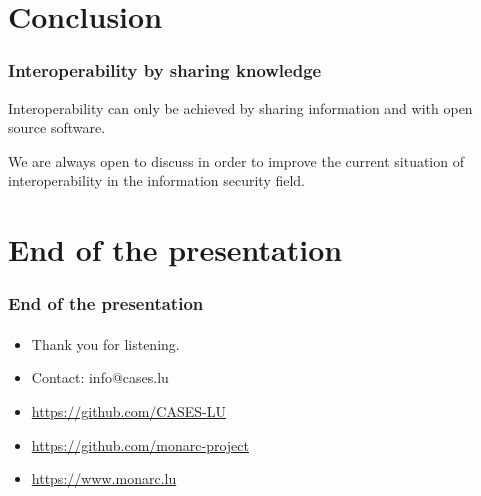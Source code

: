 \documentclass[]{beamer}
\begin{document}
\section*{Conclusion}
\begin{frame}
  \frametitle{Interoperability by sharing knowledge}
  \begin{center}
    Interoperability can only be achieved by sharing information and with open source software.
  \end{center}
  \bigskip
  We are always open to discuss in order to improve the current situation of interoperability in the information security field.
\end{frame}


%
%
\section*{End of the presentation}
\begin{frame}
  \frametitle{End of the presentation}
  \framesubtitle{}
  \begin{center}
    \begin{itemize}
      \item Thank you for listening.
      \item Contact: info@cases.lu
      \item \url{https://github.com/CASES-LU}
      \item \url{https://github.com/monarc-project}
      \item \url{https://www.monarc.lu}
    \end{itemize}
  \end{center}
\end{frame}
\end{document}
